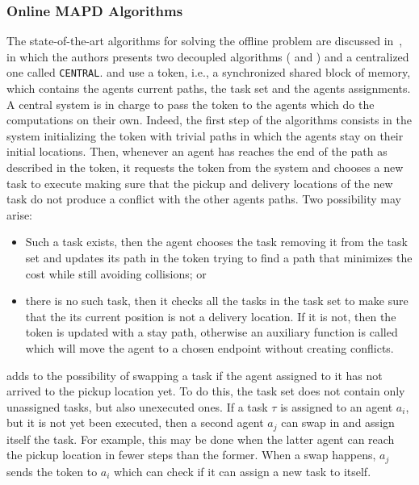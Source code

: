 \subsubsection{Online MAPD Algorithms}
The state-of-the-art algorithms for solving the offline  problem are
discussed in~\cite{onlineMAPD}, in which the authors presents two decoupled 
algorithms ( and ) and a centralized one called
\texttt{CENTRAL}. \newline
{} and  use a token, i.e., a synchronized shared block of
memory, which contains the agents current paths, the task set and the agents
assignments. A central system is in charge to pass the token to the agents
which do the computations on their own. Indeed, the first step of the
algorithms consists in the system initializing the token with trivial paths in
which the agents stay on their initial locations. Then, whenever an agent has
reaches the end of the path as described in the token, it requests the token
from the system and chooses a new task to execute making sure that the pickup
and delivery locations of the new task do not produce a conflict with the other
agents paths. Two possibility may arise:
\begin{itemize}
  \item Such a task exists, then the agent chooses the task removing it from
    the task set and updates its path in the token trying to find a path that
    minimizes the cost while still avoiding collisions; or
  \item there is no such task, then it checks all the tasks in the task set to
    make sure that the its current position is not a delivery location. If it
    is not, then the token is updated with a stay path, otherwise an auxiliary
    function is called which will move the agent to a chosen endpoint without
    creating conflicts. 
\end{itemize}
 adds to  the possibility of swapping a task if the agent
assigned to it has not arrived to the pickup location yet. To do this, the task
set does not contain only unassigned tasks, but also unexecuted ones. If a task
$\tau$ is assigned to an agent $a_i$, but it is not yet been executed, then a
second agent $a_j$ can swap in and assign itself the task. For example, this
may be done when the latter agent can reach the pickup location in fewer steps 
than the former. When a swap happens, $a_j$ sends the token to $a_i$ which can
check if it can assign a new task to itself. 
